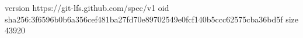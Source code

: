version https://git-lfs.github.com/spec/v1
oid sha256:3f6596b0b6a356cef481ba27fd70e89702549e0fcf140b5ccc62575cba36bd5f
size 43920
